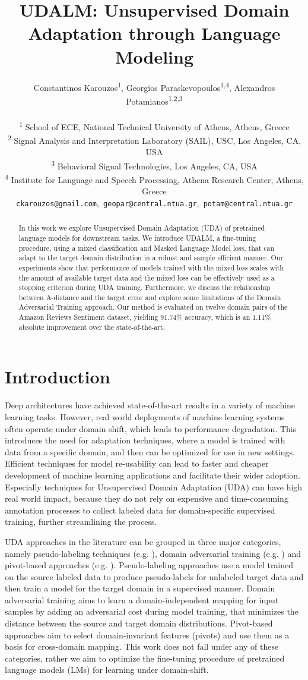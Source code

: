 \documentclass[11pt]{article}
\title{UDALM: Unsupervised Domain Adaptation through Language Modeling}
\author{Constantinos Karouzos\textsuperscript{1},
        Georgios Paraskevopoulos\textsuperscript{1,4}, 
        Alexandros Potamianos\textsuperscript{1,2,3} \\
\\
  \textsuperscript{1} School of ECE, National Technical University of Athens, Athens, Greece \\
  \textsuperscript{2} Signal Analysis and Interpretation Laboratory (SAIL), USC, Los Angeles, CA, USA \\
  \textsuperscript{3} Behavioral Signal Technologies, Los Angeles, CA, USA \\
    \textsuperscript{4} Institute for Language and Speech Processing, Athena Research Center, Athens, Greece \\
  \texttt{ckarouzos@gmail.com},\texttt{ geopar@central.ntua.gr},\texttt{ potam@central.ntua.gr}}
\begin{document}
\maketitle
\begin{abstract}
In this work we explore Unsupervised Domain Adaptation (UDA) of pretrained language models for downstream tasks.
We introduce UDALM, a fine-tuning procedure, using a mixed classification and Masked Language Model loss, that can adapt to the target domain distribution in a robust and sample efficient manner.
Our experiments show that performance of models trained with the mixed loss scales with the amount of available target data and the mixed loss can be effectively used as a stopping criterion during UDA training.
Furthermore, we discuss the relationship between A-distance and the target error and explore some limitations of the Domain Adversarial Training approach.
Our method is evaluated on twelve domain pairs of the Amazon Reviews Sentiment dataset, yielding $91.74\%$ accuracy, which is an $1.11\%$ absolute improvement over the state-of-the-art.
\end{abstract}

\section{Introduction}

Deep architectures have achieved state-of-the-art results in a variety of machine learning tasks.
However, real world deployments of machine learning systems often operate under domain shift, which leads to performance degradation.
This introduces the need for adaptation techniques, where a model is trained with data from a specific domain, and then can be optimized for use in new settings.
Efficient techniques for model re-usability can lead to faster and cheaper development of machine learning applications and facilitate their wider adoption.
Especially techniques for Unsupervised Domain Adaptation (UDA) can have high real world impact, because they do not rely on expensive and time-consuming annotation processes to collect labeled data for domain-specific supervised training, further streamlining the process.


UDA approaches in the literature can be grouped in three major categories, namely pseudo-labeling techniques (e.g. \citealp{yarowsky-1995-unsupervised, zhou2005tri}), domain adversarial training (e.g. \citealp{ganin2016domain}) and pivot-based approaches (e.g. \citealp{blitzer-etal-2006-domain, pan2010cross}). Pseudo-labeling approaches use a model trained on the source labeled data to produce pseudo-labels for unlabeled target data and then train a model for the target domain in a supervised manner. Domain adversarial training aims to learn a domain-independent mapping for input samples by adding an adversarial cost during model training, that minimizes the distance between the source and target domain distributions. Pivot-based approaches aim to select domain-invariant features (pivots) and use them as a basis for cross-domain mapping.
This work does not fall under any of these categories, rather we aim to optimize the fine-tuning procedure of pretrained language models (LMs) for learning under domain-shift.
\end{document}
